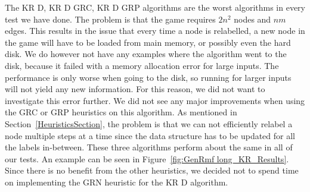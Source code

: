 The KR D, KR D GRC, KR D GRP algorithms are the worst algorithms in every test we have done.
The problem is that the game requires $2n^2$ nodes and $nm$ edges.
This results in the issue that every time a node is relabelled, a new node in the game will have to be loaded from main memory, or possibly even the hard disk.
We do however not have any examples where the algorithm went to the disk, because it failed with a memory allocation error for large inputs.
The performance is only worse when going to the disk, so running for larger inputs will not yield any new information. For this reason, we did not want to investigate this error further.
We did not see any major improvements when using the GRC or GRP heuristics on this algorithm.
As mentioned in Section~\ref{HeuristicsSection}, the problem is that we can not efficiently relabel a node multiple steps at a time since the data structure has to be updated for all the labels in-between.
These three algorithms perform about the same in all of our tests. An example can be seen in Figure~\ref{fig:GenRmf long_KR_Results}.
Since there is no benefit from the other heuristics, we decided not to spend time on implementing the GRN heuristic for the KR D algorithm.



